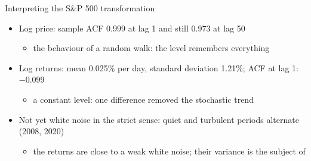 \begin{frame}{Interpreting the S\&P 500 transformation}
\itemsize{\small}
\begin{itemize}
    \item Log price: sample ACF 0.999 at lag 1 and still 0.973 at lag 50
    \begin{itemize}
        \item the behaviour of a random walk: the level remembers everything
    \end{itemize}
    \item Log returns: mean 0.025\% per day, standard deviation 1.21\%; ACF at lag 1: $\ensuremath{-}0.099$
    \begin{itemize}
        \item a constant level: one difference removed the stochastic trend
    \end{itemize}
    \item Not yet white noise in the strict sense: quiet and turbulent periods alternate (2008, 2020)
    \begin{itemize}
        \item the returns are close to a weak white noise; their variance is the subject of 
    \end{itemize}
\end{itemize}
\end{frame}

